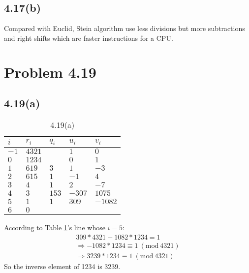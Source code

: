 \documentclass[acmlarge,screen]{acmart}
\begin{document}
\begin{CJK*}{UTF8}{gbsn}
\subsection{4.17(b)}
Compared with Euclid, Stein algorithm use less divisions but more subtractions and right shifts which are faster instructions for a CPU.
\section{Problem 4.19}
\subsection{4.19(a)}
\begin{table}
  \caption{4.19(a)}
  \label{tab:4.19(a)}
  \begin{tabular}{m{5em} m{5em} m{5em} m{5em} m{5em}}
    \toprule
    $i$&$r_i$&$q_i$&$u_i$&$v_i$\\
    \midrule
    $-1$&$4321$&&$1$&$0$\\
    $0$&$1234$&&$0$&$1$\\
	$1$&$619$&$3$&$1$&$-3$\\
	$2$&$615$&$1$&$-1$&$4$\\
	$3$&$4$&$1$&$2$&$-7$\\
	$4$&$3$&$153$&$-307$&$1075$\\
	$5$&$1$&$1$&$309$&$-1082$\\
	$6$&$0$&&&\\
  \bottomrule
\end{tabular}
\end{table}
According to Table \ref{tab:4.19(a)}'s line whose $i=5$:
\begin{align*}
	309*4321-1082*1234=1\\
	\Rightarrow-1082*1234\equiv1\ (\text{mod}\ 4321)\\
	\Rightarrow3239*1234\equiv1\ (\text{mod}\ 4321)
\end{align*}
So the inverse element of 1234 is 3239.

\end{CJK*}
\end{document}
